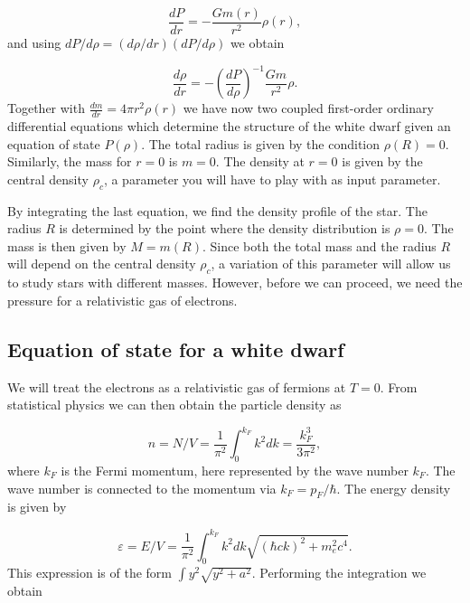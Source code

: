 \documentclass[%
oneside,                 %
final,                   %
10pt]{article}
\begin{document}
\begin{equation*}
\frac{dP}{dr}=-\frac{Gm(r)}{r^{2}}\rho (r),
\end{equation*}
and using $dP/d\rho = (d\rho/dr)(dP/d\rho)$ we obtain

\begin{equation*}
\frac{d\rho}{dr}=-\left(\frac{dP}{d\rho}\right)^{-1}\frac{Gm}{r^{2}}\rho.
\end{equation*}
Together with $\frac{dm}{dr}=4\pi r^{2}\rho (r)$
we have now two coupled first-order ordinary differential equations
which determine the structure of the white dwarf given an equation of state
$P(\rho )$.
The total radius is given by the condition 
$\rho (R)=0$. 
Similarly, the mass for $r=0$
is $m=0$.  
The density at $r=0$ is given by the central density $\rho_{c}$, a parameter you will have to play with 
as input parameter.

By integrating the last equation, we find the density profile of the star.
The radius $R$ is determined by the point where 
the density distribution
is $\rho =0$. 
The mass is then given by $M=m(R)$.
Since both the total mass and the radius $R$ will depend on the central density
$\rho_{c}$, a variation of this parameter will allow us to study stars 
with different masses.
However, before we can proceed, we need the pressure for a relativistic gas of electrons.

\subsection*{Equation of state for a white dwarf}

We will treat the electrons as a relativistic gas of fermions at $T=0$.
From statistical physics we can then obtain the particle density as

\begin{equation*}
n=N/V=\frac{1}{\pi^{2}}\int_{0}^{k_{F}}k^{2}dk=\frac{k_{F}^{3}}{3\pi^{2}},
\end{equation*}
where $k_F$ is the Fermi momentum, here represented by the wave number $k_F$.
The wave number is connected to the momentum via $k_F=p_F/\hbar$.
The energy density is given by

\begin{equation*}
\varepsilon=E/V=\frac{1}{\pi^{2}}\int_{0}^{k_{F}}k^{2}dk
\sqrt{(\hbar ck)^{2}+m_{e}^{2}c^{4}}.
\end{equation*}
This expression is of the form $\int y^2\sqrt{y^2+a^2}$. Performing the integration we obtain
\end{document}
